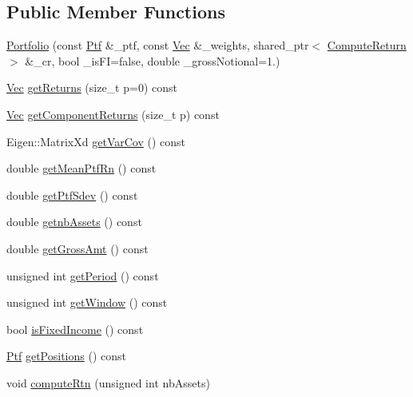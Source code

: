 \subsection*{Public Member Functions}
\begin{DoxyCompactItemize}
\item 
\hyperlink{classPortfolio_a573528cf895e6c963c37f423486aaac9}{Portfolio} (const \hyperlink{portfolio_8h_ab6c2cd0942dd9f72ca64d9dbadb0df64}{Ptf} \&\+\_\+ptf, const \hyperlink{compute__returns__eigen_8h_a1eb6a9306ef406d7975f3cbf2e247777}{Vec} \&\+\_\+weights, shared\+\_\+ptr$<$ \hyperlink{classComputeReturn}{Compute\+Return} $>$ \&\+\_\+cr, bool \+\_\+is\+FI=false, double \+\_\+gross\+Notional=1.)
\item 
\hyperlink{compute__returns__eigen_8h_a1eb6a9306ef406d7975f3cbf2e247777}{Vec} \hyperlink{classPortfolio_a51b835c644d10dcad9af190112d89123}{get\+Returns} (size\+\_\+t p=0) const
\item 
\hyperlink{compute__returns__eigen_8h_a1eb6a9306ef406d7975f3cbf2e247777}{Vec} \hyperlink{classPortfolio_aa235d5de98468ec656ddff1550fe5fbf}{get\+Component\+Returns} (size\+\_\+t p) const
\item 
Eigen\+::\+Matrix\+Xd \hyperlink{classPortfolio_adc5f7b744cacda38f442277d60ab77a0}{get\+Var\+Cov} () const
\item 
double \hyperlink{classPortfolio_a391b4742d7394009c34e9c9e4addc35e}{get\+Mean\+Ptf\+Rn} () const
\item 
double \hyperlink{classPortfolio_a4483f32cc7d592016c04acc7500e8217}{get\+Ptf\+Sdev} () const
\item 
double \hyperlink{classPortfolio_a165529ad0f08f24081e3bca8b354e217}{getnb\+Assets} () const
\item 
double \hyperlink{classPortfolio_aa91be98ef8fdd16bd3ebc9aa66529554}{get\+Gross\+Amt} () const
\item 
unsigned int \hyperlink{classPortfolio_a86ea8204e8ba0c9dd69c0fd3ba4abb16}{get\+Period} () const
\item 
unsigned int \hyperlink{classPortfolio_a3d2bbcfa8f794d8fefad630abefdce7b}{get\+Window} () const
\item 
bool \hyperlink{classPortfolio_acdfc56639cad8ed648780d81f066d760}{is\+Fixed\+Income} () const
\item 
\hyperlink{portfolio_8h_ab6c2cd0942dd9f72ca64d9dbadb0df64}{Ptf} \hyperlink{classPortfolio_a28f00509ec2ed08fe781eb684c923348}{get\+Positions} () const
\item 
void \hyperlink{classPortfolio_aa00669a3d5caece170ee8b28c0c67a2d}{compute\+Rtn} (unsigned int nb\+Assets)

\end{DoxyCompactItemize}

